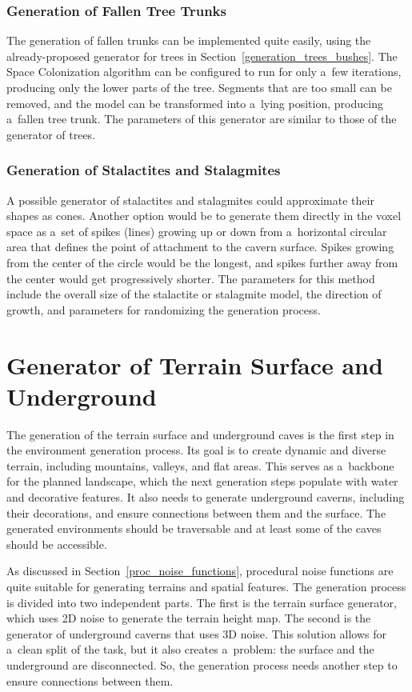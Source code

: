 \subsubsection{Generation of Fallen Tree Trunks}
The generation of fallen trunks can be implemented quite easily, using the already-proposed generator for trees in Section~\ref{generation_trees_bushes}. The Space Colonization algorithm can be configured to run for only a~few iterations, producing only the lower parts of the tree. Segments that are too small can be removed, and the model can be transformed into a~lying position, producing a~fallen tree trunk. The parameters of this generator are similar to those of the generator of trees.

\subsubsection{Generation of Stalactites and Stalagmites}
A possible generator of stalactites and stalagmites could approximate their shapes as cones. Another option would be to generate them directly in the voxel space as a~set of spikes (lines) growing up or down from a~horizontal circular area that defines the point of attachment to the cavern surface. Spikes growing from the center of the circle would be the longest, and spikes further away from the center would get progressively shorter. The parameters for this method include the overall size of the stalactite or stalagmite model, the direction of growth, and parameters for randomizing the generation process.

\section{Generator of Terrain Surface and Underground}

The generation of the terrain surface and underground caves is the first step in the environment generation process. Its goal is to create dynamic and diverse terrain, including mountains, valleys, and flat areas. This serves as a~backbone for the planned landscape, which the next generation steps populate with water and decorative features. It also needs to generate underground caverns, including their decorations, and ensure connections between them and the surface. The generated environments should be traversable and at least some of the caves should be accessible.

As discussed in Section~\ref{proc_noise_functions}, procedural noise functions are quite suitable for generating terrains and spatial features. The generation process is divided into two independent parts. The first is the terrain surface generator, which uses 2D noise to generate the terrain height map. The second is the generator of underground caverns that uses 3D noise. This solution allows for a~clean split of the task, but it also creates a~problem: the surface and the underground are disconnected. So, the generation process needs another step to ensure connections between them.

